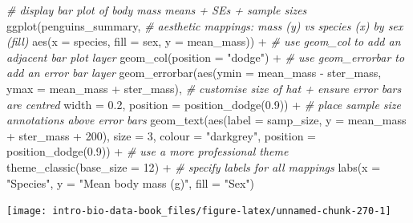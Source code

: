 \documentclass[
]{book}
\newenvironment{Shaded}{\begin{snugshade}}{\end{snugshade}}
\newcommand{\AttributeTok}[1]{\textcolor[rgb]{0.77,0.63,0.00}{#1}}
\newcommand{\CommentTok}[1]{\textcolor[rgb]{0.56,0.35,0.01}{\textit{#1}}}
\newcommand{\DecValTok}[1]{\textcolor[rgb]{0.00,0.00,0.81}{#1}}
\newcommand{\FloatTok}[1]{\textcolor[rgb]{0.00,0.00,0.81}{#1}}
\newcommand{\FunctionTok}[1]{\textcolor[rgb]{0.00,0.00,0.00}{#1}}
\newcommand{\NormalTok}[1]{#1}
\newcommand{\SpecialCharTok}[1]{\textcolor[rgb]{0.00,0.00,0.00}{#1}}
\newcommand{\StringTok}[1]{\textcolor[rgb]{0.31,0.60,0.02}{#1}}
\begin{document}
\begin{Shaded}
\begin{Highlighting}[]
\CommentTok{\# display bar plot of body mass means + SE\textquotesingle{}s + sample sizes}
\FunctionTok{ggplot}\NormalTok{(penguins\_summary, }
       \CommentTok{\# aesthetic mappings: mass (y) vs species (x) by sex (fill)}
       \FunctionTok{aes}\NormalTok{(}\AttributeTok{x =}\NormalTok{ species, }\AttributeTok{fill =}\NormalTok{ sex, }\AttributeTok{y =}\NormalTok{ mean\_mass)) }\SpecialCharTok{+} 
  \CommentTok{\# use geom\_col to add an adjacent bar plot layer}
  \FunctionTok{geom\_col}\NormalTok{(}\AttributeTok{position =} \StringTok{"dodge"}\NormalTok{) }\SpecialCharTok{+} 
  \CommentTok{\# use geom\_errorbar to add an error bar layer}
  \FunctionTok{geom\_errorbar}\NormalTok{(}\FunctionTok{aes}\NormalTok{(}\AttributeTok{ymin =}\NormalTok{ mean\_mass }\SpecialCharTok{{-}}\NormalTok{ ster\_mass, }\AttributeTok{ymax =}\NormalTok{ mean\_mass }\SpecialCharTok{+}\NormalTok{ ster\_mass),}
                \CommentTok{\# customise size of hat + ensure error bars are centred}
                \AttributeTok{width =} \FloatTok{0.2}\NormalTok{, }\AttributeTok{position =} \FunctionTok{position\_dodge}\NormalTok{(}\FloatTok{0.9}\NormalTok{)) }\SpecialCharTok{+} 
  \CommentTok{\# place sample size annotations above error bars}
  \FunctionTok{geom\_text}\NormalTok{(}\FunctionTok{aes}\NormalTok{(}\AttributeTok{label =}\NormalTok{ samp\_size, }\AttributeTok{y =}\NormalTok{ mean\_mass }\SpecialCharTok{+}\NormalTok{ ster\_mass }\SpecialCharTok{+} \DecValTok{200}\NormalTok{),}
            \AttributeTok{size =} \DecValTok{3}\NormalTok{, }\AttributeTok{colour =} \StringTok{"darkgrey"}\NormalTok{, }\AttributeTok{position =} \FunctionTok{position\_dodge}\NormalTok{(}\FloatTok{0.9}\NormalTok{)) }\SpecialCharTok{+} 
  \CommentTok{\# use a more professional theme }
  \FunctionTok{theme\_classic}\NormalTok{(}\AttributeTok{base\_size =} \DecValTok{12}\NormalTok{) }\SpecialCharTok{+} 
  \CommentTok{\# specify labels for all mappings}
  \FunctionTok{labs}\NormalTok{(}\AttributeTok{x =} \StringTok{"Species"}\NormalTok{, }\AttributeTok{y =} \StringTok{"Mean body mass (g)"}\NormalTok{, }\AttributeTok{fill =} \StringTok{"Sex"}\NormalTok{)}
\end{Highlighting}
\end{Shaded}

\begin{center}\texttt{[image: intro-bio-data-book\_files/figure-latex/unnamed-chunk-270-1]} \end{center}
\end{document}

